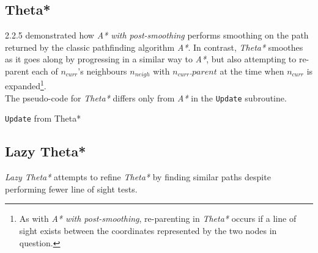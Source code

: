 \documentclass[12pt,notitlepage]{report}
\begin{document}
\subsection {Theta*}

2.2.5 demonstrated how {\em A* with post-smoothing} performs smoothing on the path returned by the classic pathfinding algorithm {\em A*}. In contrast, {\em Theta*} smoothes as it goes along by progressing in a similar way to {\em A*}, but also attempting to re-parent each of $n_{curr}$'s neighbours $n_{neigh}$ with $n_{curr}.parent$ at the time when $n_{curr}$ is expanded\footnote{As with {\em A* with post-smoothing}, re-parenting in {\em Theta*} occurs if a line of sight exists between the coordinates represented by the two nodes in question.}.\\

\noindent
The pseudo-code for {\em Theta*} differs only from {\em A*} in the {\tt Update} subroutine.

\begin{algorithm}
  \SetAlgoLined\DontPrintSemicolon
  \caption{{\tt Update} from {\sc Theta*}}
\end{algorithm} 

\subsection {Lazy Theta*}

{\em Lazy Theta*} attempts to refine {\em Theta*} by finding similar paths despite performing fewer line of sight tests.\\
\end{document}
